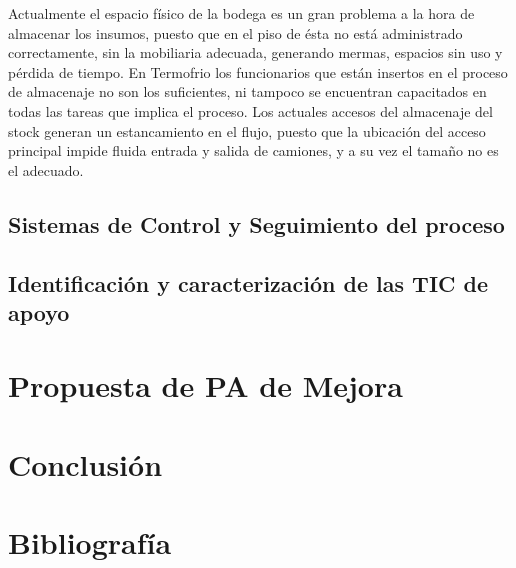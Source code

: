  Actualmente el espacio físico de la bodega es un gran problema a la hora de almacenar los insumos, puesto que en el piso de ésta no está administrado correctamente, sin la mobiliaria adecuada,
generando mermas, espacios sin uso y pérdida de tiempo.
 En Termofrio los funcionarios que están insertos en el proceso de almacenaje no son los suficientes, ni tampoco se encuentran capacitados en todas las tareas que implica el proceso.
 Los actuales accesos del almacenaje del stock generan un estancamiento en el flujo, puesto que la ubicación del acceso principal impide fluida entrada y salida de camiones, y a su vez el tamaño no es el adecuado.

	\subsection{Sistemas de Control y Seguimiento del proceso}
	
	
	\subsection{Identificación y caracterización de las TIC de apoyo}
\section{Propuesta de PA de Mejora}
\section{Conclusión}
\section{Bibliografía}

	

